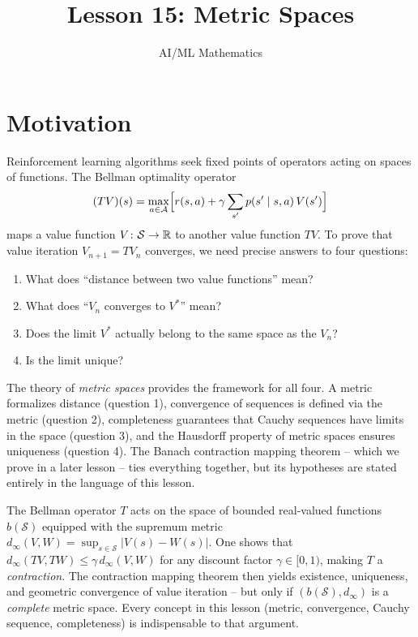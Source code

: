 \documentclass[11pt,a4paper]{article}
\title{Lesson 15: Metric Spaces}
\author{AI/ML Mathematics}
\date{}
\begin{document}
\maketitle
\tableofcontents
\newpage


\section{Motivation}
\label{sec:motivation}

Reinforcement learning algorithms seek fixed points of operators acting on
spaces of functions. The Bellman optimality operator
\begin{equation}
\label{eq:bellman}
(TV)(s) = \max_{a \in \mathcal{A}} \Bigl[ r(s,a) + \gamma
  \sum_{s'} p(s' \mid s,a)\, V(s') \Bigr]
\end{equation}
maps a value function $V \colon \mathcal{S} \to \mathbb{R}$ to another value function
$TV$. To prove that value iteration $V_{n+1} = TV_n$ converges, we need
precise answers to four questions:
\begin{enumerate}[nosep]
  \item What does ``distance between two value functions'' mean?
  \item What does ``$V_n$ converges to $V^*$'' mean?
  \item Does the limit $V^*$ actually belong to the same space as the $V_n$?
  \item Is the limit unique?
\end{enumerate}

\noindent
The theory of \emph{metric spaces} provides the framework for all four. A
metric formalizes distance (question 1), convergence of sequences is defined
via the metric (question 2), completeness guarantees that Cauchy sequences
have limits in the space (question 3), and the Hausdorff property of metric
spaces ensures uniqueness (question 4). The Banach contraction mapping
theorem -- which we prove in a later lesson -- ties everything together, but
its hypotheses are stated entirely in the language of this lesson.

\begin{rlconnection}[title={The Bellman Operator on a Metric Space}]
The Bellman operator $T$ acts on the space of bounded real-valued functions
$b(\mathcal{S})$ equipped with the supremum metric
$d_\infty(V, W) = \sup_{s \in \mathcal{S}} |V(s) - W(s)|$. One shows that
$d_\infty(TV, TW) \le \gamma\, d_\infty(V, W)$ for any discount factor
$\gamma \in [0,1)$, making $T$ a \emph{contraction}. The contraction mapping
theorem then yields existence, uniqueness, and geometric convergence of value
iteration -- but only if $(b(\mathcal{S}), d_\infty)$ is a \emph{complete}
metric space. Every concept in this lesson (metric, convergence, Cauchy
sequence, completeness) is indispensable to that argument.
\end{rlconnection}
\end{document}
